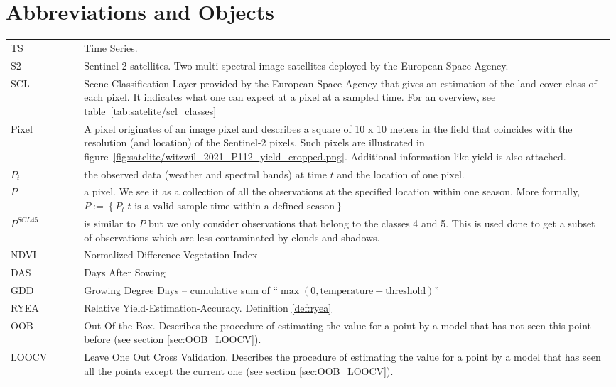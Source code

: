 \section*{Abbreviations and Objects}
\begin{longtable}{p{0.12\linewidth} p{0.87\linewidth}}
TS	
		& Time Series. \\
S2	
		& Sentinel 2 satellites. Two multi-spectral image satellites deployed by the European Space Agency. \\
SCL	
		& Scene Classification Layer provided by the European Space Agency that gives an estimation of the land cover class of each pixel. It indicates what one can expect at a pixel at a sampled time. For an overview, see table~\ref{tab:satelite/scl_classes}\\
Pixel	
		& A pixel originates of an image pixel and describes a square of 10 x 10 meters in the field that coincides with the resolution (and location) of the Sentinel-2 pixels. Such pixels are illustrated in figure~\ref{fig:satelite/witzwil_2021_P112_yield_cropped.png}. Additional information like yield is also attached.\\

$P_t$	
		& the observed data (weather and spectral bands) at time $t$ and the location of one pixel. \\

$P$	
		& a pixel. We see it as a collection of all the observations at the specified location within one season. More formally, $P := \left\{P_t | t\text{ is a valid sample time within a defined season}\right\}$\\


$P^{SCL45}$	
		& is similar to $P$ but we only consider observations that belong to the classes 4 and 5. This is used done to get a subset of observations which are less contaminated by clouds and shadows.\\

NDVI	
		& Normalized Difference Vegetation Index \citep{rouseMonitoringVernalAdvancement1974}\\

DAS	
		& Days After Sowing\\

GDD	
		& Growing Degree Days -- cumulative sum of ``$\max(0, \text{temperature}-\text{threshold})$''\\

RYEA 	
		& Relative Yield-Estimation-Accuracy. Definition \ref{def:ryea}\\

OOB 	
		& Out Of the Box. Describes the procedure of  estimating the value for a point by a model that has not seen this point before (see section \ref{sec:OOB_LOOCV}).\\

LOOCV 	
		& Leave One Out Cross Validation. Describes the procedure of estimating the value for a point by a model that has seen all the points except the current one (see section \ref{sec:OOB_LOOCV}).\\
\end{longtable} 

